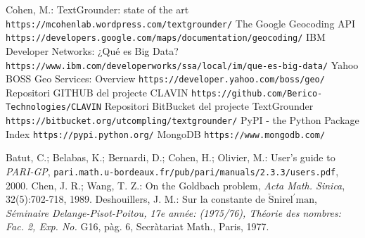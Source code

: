 \documentclass[12pt,a4paper,openright,oneside]{article}
\numberwithin{equation}{section}
\theoremstyle{definition}
\begin{document}
\begin{thebibliography}{25}
\bibitem{} Cohen, M.: TextGrounder: state of the art
\newline \texttt{https://mcohenlab.wordpress.com/textgrounder/}
\bibitem{} The Google Geocoding API
\newline \texttt{https://developers.google.com/maps/documentation/geocoding/}
\bibitem{} IBM Developer Networks: ¿Qué es Big Data?
\newline \texttt{https://www.ibm.com/developerworks/ssa/local/im/que-es-big-data/}
\bibitem{} Yahoo BOSS Geo Services: Overview
\newline \texttt{https://developer.yahoo.com/boss/geo/}
\bibitem{} Repositori GITHUB del projecte CLAVIN
\newline \texttt{https://github.com/Berico-Technologies/CLAVIN}
\bibitem{} Repositori BitBucket del projecte TextGrounder
\newline \texttt{https://bitbucket.org/utcompling/textgrounder/}
\bibitem{} PyPI - the Python Package Index
\newline \texttt{https://pypi.python.org/}
\bibitem{} MongoDB
\newline \texttt{https://www.mongodb.com/}


 Batut, C.; Belabas, K.; Bernardi, D.; Cohen, H.; Olivier, M.: User's guide to \textit{PARI-GP},  \newline \texttt{pari.math.u-bordeaux.fr/pub/pari/manuals/2.3.3/users.pdf}, 2000.
 Chen, J. R.; Wang, T. Z.: On the Goldbach problem, \textit{Acta Math. Sinica}, 32(5):702-718, 1989.
 Deshouillers, J. M.: Sur la constante de $\check{\text{S}}\text{nirel}^{\prime} \text{man}$, \textit{Séminaire Delange-Pisot-Poitou, 17e année: (1975/76), Théorie des nombres: Fac. 2, Exp. No.} G16, pàg. 6, Secràtariat Math., Paris, 1977.

\end{thebibliography}
\end{document}
